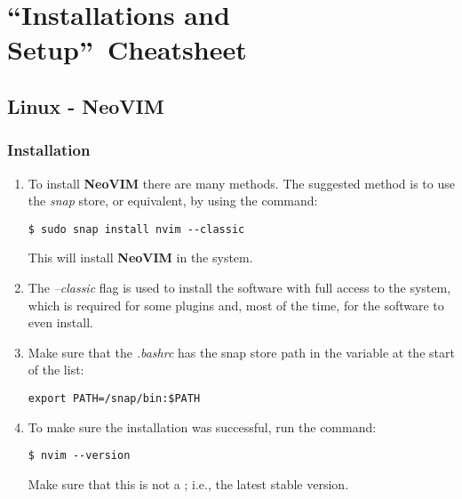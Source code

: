 \section{\textquotedblleft Installations and Setup\textquotedblright\
Cheatsheet
}


\subsection{Linux - NeoVIM}

\subsubsection{Installation}

\begin{enumerate}
    \item To install \textbf{NeoVIM} there are many methods. The suggested method is to use the
    \textit{snap} store, or equivalent, by using the command:
    \begin{verbatim}
$ sudo snap install nvim --classic
    \end{verbatim}
    This will install \textbf{NeoVIM} in the system.
    \item The \textit{--classic} flag is used to install the software with full access to the
    system, which is required for some plugins and, most of the time, for the software to even
    install.
    \item Make sure that the
    \textit{.bashrc} has the snap store path in the  variable at the start of
    the list:
    \begin{verbatim}
export PATH=/snap/bin:$PATH
    \end{verbatim}
    \item To make sure the installation was successful, run the command:
    \begin{verbatim}
$ nvim --version
    \end{verbatim}
    Make sure that this is not a ; i.e., the latest stable version.
\end{enumerate}

